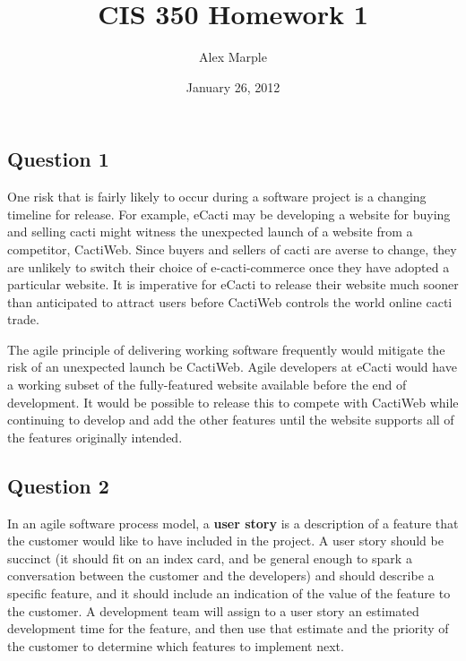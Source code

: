 \documentclass{article}
\begin{document}
\title{CIS 350 Homework 1}
\date{January 26, 2012}
\author{Alex Marple}

\maketitle

\subsection*{Question 1}
One risk that is fairly likely to occur during a software project is a changing timeline for release.  For example, eCacti may be developing a website for buying and selling cacti might witness the unexpected launch of a website from a competitor, CactiWeb.  Since buyers and sellers of cacti are averse to change, they are unlikely to switch their choice of e-cacti-commerce once they have adopted a particular website.  It is imperative for eCacti to release their website much sooner than anticipated to attract users before CactiWeb controls the world online cacti trade.

The agile principle of delivering working software frequently would mitigate the risk of an unexpected launch be CactiWeb.  Agile developers at eCacti would have a working subset of the fully-featured website available before the end of development.  It would be possible to release this to compete with CactiWeb while continuing to develop and add the other features until the website supports all of the features originally intended.

\subsection*{Question 2}
In an agile software process model, a \textbf{user story} is a description of a feature that the customer would like to have included in the project.  A user story should be succinct (it should fit on an index card, and be general enough to spark a conversation between the customer and the developers) and should describe a specific feature, and it should include an indication of the value of the feature to the customer.  A development team will assign to a user story an estimated development time for the feature, and then use that estimate and the priority of the customer to determine which features to implement next.
\end{document}
